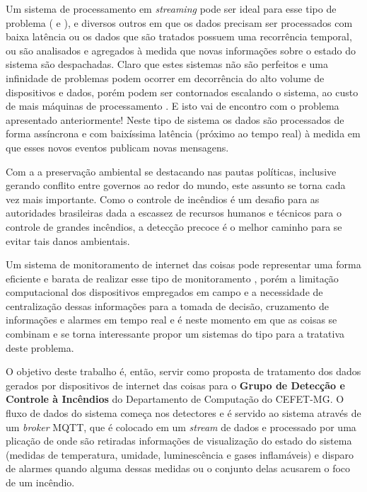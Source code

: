 \documentclass[12pt]{article}
\begin{document}
Um sistema de processamento em \textit{streaming} pode ser ideal para esse tipo de problema (\cite{isah:18} e \cite{meehan:17}), e diversos outros em que os dados precisam ser processados com baixa latência ou os dados que são tratados possuem uma recorrência temporal, ou são analisados e agregados à medida que novas informações sobre o estado do sistema são despachadas. Claro que estes sistemas não são perfeitos e uma infinidade de problemas podem ocorrer em decorrência do alto volume de dispositivos e dados, porém podem ser contornados escalando o sistema, ao custo de mais máquinas de processamento \cite{dey:18}. E isto vai de encontro com o problema apresentado anteriormente! Neste tipo de sistema os dados são processados de forma assíncrona e com baixíssima latência (próximo ao tempo real) à medida em que esses novos eventos publicam novas mensagens.

Com a a preservação ambiental se destacando nas pautas políticas, inclusive gerando conflito entre governos ao redor do mundo, este assunto se torna cada vez mais importante. Como o controle de incêndios é um desafio para as autoridades brasileiras dada a escassez de recursos humanos e técnicos para o controle de grandes incêndios, a detecção precoce é o melhor caminho para se evitar tais danos ambientais.

Um sistema de monitoramento de internet das coisas pode representar uma forma eficiente e barata de realizar esse tipo de monitoramento \cite{albuquerque:20}, porém a limitação computacional dos dispositivos empregados em campo e a necessidade de centralização dessas informações para a tomada de decisão, cruzamento de informações e alarmes em tempo real e é neste momento em que as coisas se combinam e se torna interessante propor um sistemas do tipo para a tratativa deste problema.

O objetivo deste trabalho é, então, servir como proposta de tratamento dos dados gerados por dispositivos de internet das coisas para o \textbf{Grupo de Detecção e Controle à Incêndios} do Departamento de Computação do CEFET-MG. O fluxo de dados do sistema começa nos detectores e é servido ao sistema através de um \textit{broker} MQTT, que é colocado em um \textit{stream} de dados e processado por uma plicação de onde são retiradas informações de visualização do estado do sistema (medidas de temperatura, umidade, luminescência e gases inflamáveis) e disparo de alarmes quando alguma dessas medidas ou o conjunto delas acusarem o foco de um incêndio.
 
\end{document}

